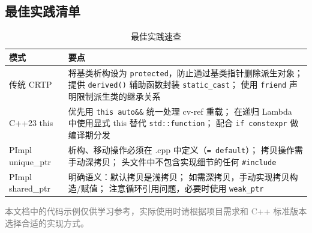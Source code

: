 \documentclass[12pt,a4paper,fontset=fandol]{ctexbook}
\begin{document}
\subsection{最佳实践清单}

\begin{table}[ht]
\centering
\caption{最佳实践速查}
\label{tab:best-practice}
\begin{tabular}{@{}>{\raggedright\arraybackslash}p{}>{\raggedright\arraybackslash}p{}@{}}
\toprule
\textbf{模式} & \textbf{要点} \\
\midrule
传统 CRTP
& 将基类析构设为 \texttt{protected}，防止通过基类指针删除派生对象；
  提供 \texttt{derived()} 辅助函数封装 \texttt{static\_cast}；
  使用 \texttt{friend} 声明限制派生类的继承关系 \\
\addlinespace
C++23 this
& 优先用 \texttt{this auto\&\&} 统一处理 cv-ref 重载；
  在递归 Lambda 中使用显式 this 替代 \texttt{std::function}；
  配合 \texttt{if constexpr} 做编译期分发 \\
\addlinespace
PImpl unique\_ptr
& 析构、移动操作必须在 .cpp 中定义（\texttt{= default}）；
  拷贝操作需手动深拷贝；
  头文件中不包含实现细节的任何 \texttt{\#include} \\
\addlinespace
PImpl shared\_ptr
& 明确语义：默认拷贝是浅拷贝；
  如需深拷贝，手动实现拷贝构造/赋值；
  注意循环引用问题，必要时使用 \texttt{weak\_ptr} \\
\bottomrule
\end{tabular}
\end{table}

\vspace{0.8cm}
\noindent{}

\vspace{0.5cm}
\noindent\textcolor{gray}{\small 本文档中的代码示例仅供学习参考，实际使用时请根据项目需求和 C++ 标准版本选择合适的实现方式。}
\end{document}
